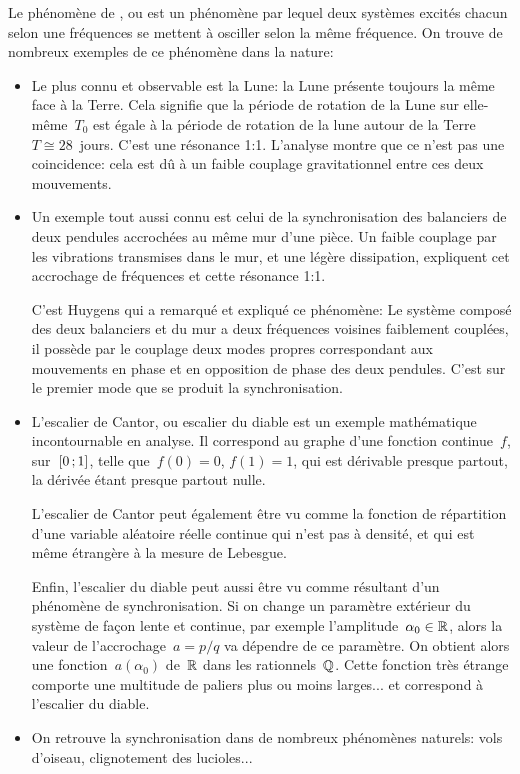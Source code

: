 \medskip
Le phénomène de , ou
 est un phénomène par lequel deux systèmes excités
chacun selon une fréquences se mettent à osciller selon la même fréquence. On trouve de nombreux
exemples de ce phénomène dans la nature:
\begin{itemize}
  \item Le plus connu et observable est la Lune: la Lune présente toujours la même face à la Terre.
	Cela signifie que la période de rotation de la Lune sur elle-même~$T_0$ est égale à la
	période de rotation de la lune autour de la Terre~$T\cong 28$~jours. C'est une
	résonance 1:1. L'analyse montre que ce n'est pas une coincidence: cela
	est dû à un faible couplage gravitationnel entre ces deux mouvements.

  \item Un exemple tout aussi connu est celui de la synchronisation des balanciers de deux pendules accrochées
	au même mur d'une pièce. Un faible couplage par les vibrations transmises dans le mur,
	et une légère dissipation, expliquent cet accrochage de fréquences et cette résonance 1:1.

	C'est Huygens qui a
	remarqué et expliqué ce phénomène:
	Le système composé des deux balanciers et du mur a deux fréquences voisines faiblement
	couplées, il possède par le couplage deux modes propres correspondant aux mouvements en
	phase et en opposition de phase des deux pendules. C'est sur le premier mode
	que se produit la synchronisation.

  \item L'escalier de Cantor,
	ou escalier du diable est un exemple mathématique incontournable en analyse.
	Il correspond au graphe d'une fonction continue~$f$, sur~$\mathopen{[}0\,;1\mathclose{]}$, telle que~$f(0)=0$, $f(1)=1$,
	qui est dérivable presque partout, la dérivée étant presque partout nulle.

	L'escalier de Cantor peut également être vu comme la fonction de répartition d'une variable
	aléatoire réelle continue qui n'est pas à densité, et qui est même étrangère à la
	mesure de Lebesgue.

	Enfin, l'escalier du diable peut aussi être vu comme résultant d'un phénomène de
	synchronisation.
	Si on change un paramètre extérieur du système de façon lente et continue, par
	exemple l'amplitude~$\alpha_0\in\mathbb R$, alors la valeur de l'accrochage~$a=p/q$ va dépendre de
	ce paramètre. On obtient alors une fonction~$a(\alpha_0)$ de~$\mathbb R$ dans les rationnels~$\mathbb Q$.
	Cette fonction très étrange comporte une multitude de paliers plus ou moins larges... et correspond
	à l'escalier du diable.
	
  \item On retrouve la synchronisation dans de nombreux phénomènes naturels: vols d'oiseau,
	clignotement des lucioles...
\end{itemize}
